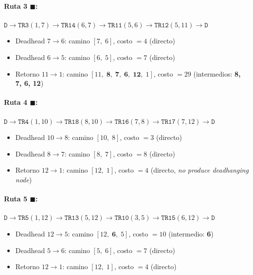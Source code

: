 \documentclass[12pt, a4paper]{article}
\begin{document}
\paragraph{Ruta 3 \textcolor{routeC}{$\blacksquare$}\;:}
$\texttt{D} \to \texttt{TR3}(1,7) \to \texttt{TR14}(6,7) \to
        \texttt{TR11}(5,6) \to \texttt{TR12}(5,11) \to \texttt{D}$
\begin{itemize}
  \item Deadhead $7 \to 6$: camino $[7,\;6]$, costo $= 4$ (directo)
  \item Deadhead $6 \to 5$: camino $[6,\;5]$, costo $= 7$ (directo)
  \item Retorno $11 \to 1$: camino
        $[11,\;\mathbf{8},\;\mathbf{7},\;\mathbf{6},\;\mathbf{12},\;1]$,
        costo $= 29$ \quad(intermedios: \textbf{8, 7, 6, 12})
\end{itemize}

\paragraph{Ruta 4 \textcolor{routeD}{$\blacksquare$}\;:}
$\texttt{D} \to \texttt{TR4}(1,10) \to \texttt{TR18}(8,10) \to
        \texttt{TR16}(7,8) \to \texttt{TR17}(7,12) \to \texttt{D}$
\begin{itemize}
  \item Deadhead $10 \to 8$: camino $[10,\;8]$, costo $= 3$ (directo)
  \item Deadhead $8 \to 7$: camino $[8,\;7]$, costo $= 8$ (directo)
  \item Retorno $12 \to 1$: camino $[12,\;1]$, costo $= 4$ (directo,
        \emph{no produce deadhanging node})
\end{itemize}

\paragraph{Ruta 5 \textcolor{routeE}{$\blacksquare$}\;:}
$\texttt{D} \to \texttt{TR5}(1,12) \to \texttt{TR13}(5,12) \to
        \texttt{TR10}(3,5) \to \texttt{TR15}(6,12) \to \texttt{D}$
\begin{itemize}
  \item Deadhead $12 \to 5$: camino $[12,\;\mathbf{6},\;5]$,
        costo $= 10$ \quad(intermedio: \textbf{6})
  \item Deadhead $5 \to 6$: camino $[5,\;6]$, costo $= 7$ (directo)
  \item Retorno $12 \to 1$: camino $[12,\;1]$, costo $= 4$ (directo)
\end{itemize}
\end{document}
